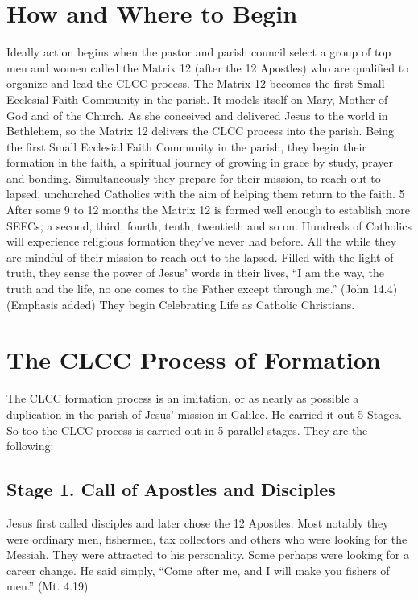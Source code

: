 \documentclass{article}
\begin{document}
\section{How and Where to Begin}

Ideally action begins when the pastor and parish council select a group of top
men and women called the Matrix 12 (after the 12 Apostles) who are qualified to
organize and lead the CLCC process. The Matrix 12 becomes the first Small
Ecclesial Faith Community in the parish. It models itself on Mary, Mother of God
and of the Church. As she conceived and delivered Jesus to the world in
Bethlehem, so the Matrix 12 delivers the CLCC process into the parish. Being the
first Small Ecclesial Faith Community in the parish, they begin their formation
in the faith, a spiritual journey of growing in grace by study, prayer and
bonding. Simultaneously they prepare for their mission, to reach out to lapsed,
unchurched Catholics with the aim of helping them return to the faith.
5
After some 9 to 12 months the Matrix 12 is formed well enough to establish more
SEFCs, a second, third, fourth, tenth, twentieth and so on. Hundreds of
Catholics will experience religious formation they've never had before. All the
while they are mindful of their mission to reach out to the lapsed. Filled with
the light of truth, they sense the power of Jesus' words in their lives, ``I am
the way, the truth and the life, no one comes to the Father except through me.''
(John 14.4)(Emphasis added) They begin Celebrating Life as Catholic Christians.

\section{The CLCC Process of Formation}

The CLCC formation process is an imitation, or as nearly as possible a
duplication in the parish of Jesus' mission in Galilee. He carried it out 5
Stages. So too the CLCC process is carried out in 5 parallel stages. They are
the following:

\subsection{Stage 1. Call of Apostles and Disciples}

Jesus first called disciples and later chose the 12 Apostles. Most notably they
were ordinary men, fishermen, tax collectors and others who were looking for the
Messiah. They were attracted to his personality. Some perhaps were looking for a
career change. He said simply, ``Come after me, and I will make you fishers of
men.'' (Mt. 4.19)
\end{document}
